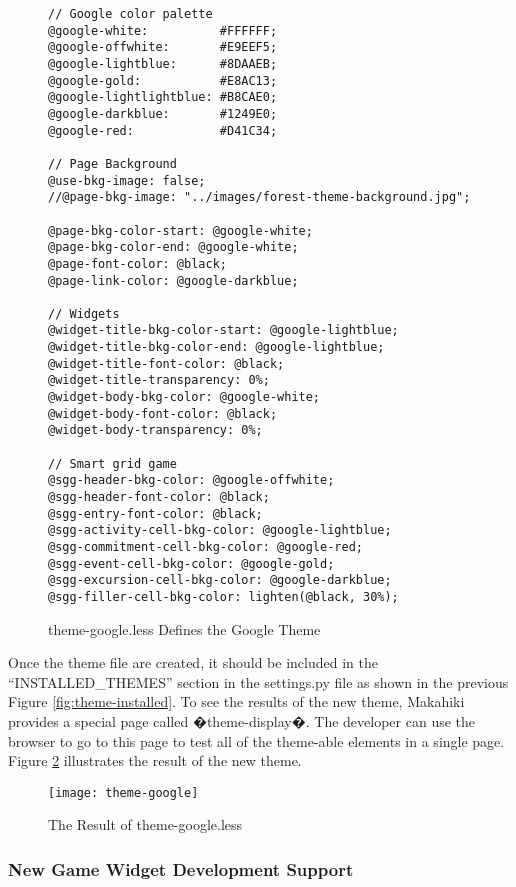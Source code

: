 \begin{figure}[!ht]
\begin{lstlisting}
// Google color palette
@google-white:          #FFFFFF;
@google-offwhite:       #E9EEF5;
@google-lightblue:      #8DAAEB;
@google-gold:           #E8AC13;
@google-lightlightblue: #B8CAE0;
@google-darkblue:       #1249E0;
@google-red:            #D41C34;

// Page Background
@use-bkg-image: false;
//@page-bkg-image: "../images/forest-theme-background.jpg";

@page-bkg-color-start: @google-white;
@page-bkg-color-end: @google-white;
@page-font-color: @black;
@page-link-color: @google-darkblue;

// Widgets
@widget-title-bkg-color-start: @google-lightblue;
@widget-title-bkg-color-end: @google-lightblue;
@widget-title-font-color: @black;
@widget-title-transparency: 0%;
@widget-body-bkg-color: @google-white;
@widget-body-font-color: @black;
@widget-body-transparency: 0%;

// Smart grid game
@sgg-header-bkg-color: @google-offwhite;
@sgg-header-font-color: @black;
@sgg-entry-font-color: @black;
@sgg-activity-cell-bkg-color: @google-lightblue;
@sgg-commitment-cell-bkg-color: @google-red;
@sgg-event-cell-bkg-color: @google-gold;
@sgg-excursion-cell-bkg-color: @google-darkblue;
@sgg-filler-cell-bkg-color: lighten(@black, 30%);

\end{lstlisting}
\caption{theme-google.less Defines the Google Theme}
\label{fig:theme-google-less}
\end{figure}

Once the theme file are created, it should be included in the ``INSTALLED\_THEMES'' section in the settings.py file as shown in the previous Figure \ref{fig:theme-installed}. To see the results of the new theme, Makahiki provides a special page called �theme-display�. The developer can use the browser to go to this page to test all of the theme-able elements in a single page. Figure \ref{fig:theme-google-test} illustrates the result of the new theme.

\begin{figure}[!ht]
  \center
  \texttt{[image: theme-google]}
  \caption{The Result of theme-google.less}
  \label{fig:theme-google-test}
\end{figure}

\clearpage

\subsubsection{New Game Widget Development Support}

